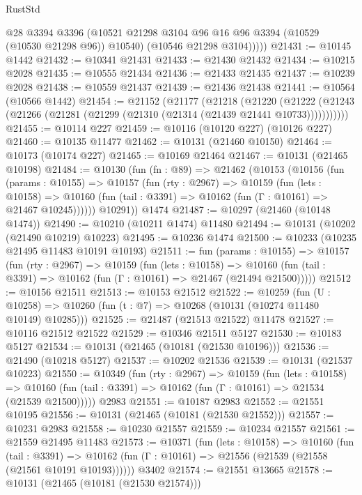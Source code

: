 \begin{lexlean}{RustStd}
\begin{coremodule}
            @28
            @3394
            @3396
            (@10521 @21298 @3104 @96 @16 @96 @3394 (@10529 (@10530 @21298 @96)) @10540)
            (@10546 @21298 @3104)))))
@21431 := @10145 @1442
@21432 := @10341 @21431
@21433 := @21430 @21432
@21434 := @10215 @2028
@21435 := @10555 @21434
@21436 := @21433 @21435
@21437 := @10239 @2028
@21438 := @10559 @21437
@21439 := @21436 @21438
@21441 := @10564 (@10566 @1442)
@21454 := @21152
    (@21177
      (@21218
        (@21220
          (@21222 (@21243 (@21266 (@21281 (@21299 (@21310 (@21314 (@21439 @21441 @10733)))))))))))
@21455 := @10114 @227
@21459 := @10116 (@10120 @227) (@10126 @227)
@21460 := @10135 @11477
@21462 := @10131 (@21460 @10150)
@21464 := @10173 (@10174 @227)
@21465 := @10169 @21464
@21467 := @10131 (@21465 @10198)
@21484 := @10130
    (fun (fn : @89) =>
    @21462
      (@10153
        (@10156
          (fun (params : @10155) =>
          @10157
            (fun (rty : @2967) =>
            @10159
              (fun (lets : @10158) =>
              @10160 (fun (tail : @3391) => @10162 (fun (Γ : @10161) => @21467 @10245))))))
        @10291))
    @1474
@21487 := @10297 (@21460 (@10148 @1474))
@21490 := @10210 (@10211 @1474) @11480
@21494 := @10131 (@10202 (@21490 @10219) @10223)
@21495 := @10236 @1474
@21500 := @10233 (@10235 @21495 @11483 @10191 @10193)
@21511 := fun (params : @10155) =>
  @10157
    (fun (rty : @2967) =>
    @10159
      (fun (lets : @10158) =>
      @10160 (fun (tail : @3391) => @10162 (fun (Γ : @10161) => @21467 (@21494 @21500)))))
@21512 := @10156 @21511
@21513 := @10153 @21512
@21522 := @10259
    (fun (U : @10258) => @10260 (fun (t : @7) => @10268 (@10131 (@10274 @11480 @10149) @10285)))
@21525 := @21487 (@21513 @21522) @11478
@21527 := @10116 @21512 @21522
@21529 := @10346 @21511 @5127
@21530 := @10183 @5127
@21534 := @10131 (@21465 (@10181 (@21530 @10196)))
@21536 := @21490 (@10218 @5127)
@21537 := @10202 @21536
@21539 := @10131 (@21537 @10223)
@21550 := @10349
    (fun (rty : @2967) =>
    @10159
      (fun (lets : @10158) =>
      @10160 (fun (tail : @3391) => @10162 (fun (Γ : @10161) => @21534 (@21539 @21500)))))
    @2983
@21551 := @10187 @2983
@21552 := @21551 @10195
@21556 := @10131 (@21465 (@10181 (@21530 @21552)))
@21557 := @10231 @2983
@21558 := @10230 @21557
@21559 := @10234 @21557
@21561 := @21559 @21495 @11483
@21573 := @10371
    (fun (lets : @10158) =>
    @10160
      (fun (tail : @3391) =>
      @10162 (fun (Γ : @10161) => @21556 (@21539 (@21558 (@21561 @10191 @10193))))))
    @3402
@21574 := @21551 @13665
@21578 := @10131 (@21465 (@10181 (@21530 @21574)))

\end{coremodule}
\end{lexlean}
